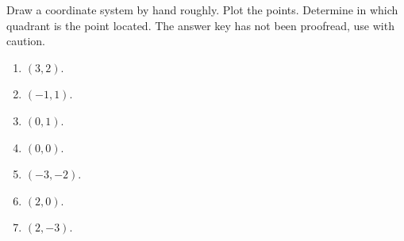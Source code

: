 Draw a coordinate system by hand roughly. Plot the points. Determine in which quadrant is the point located. The answer key has not been proofread, use with caution.
\begin{multicols}{3}
\begin{enumerate} [ref={\fcProblemRef}]
\item $ (3,2)$.

\item $ (-1,1)$.

\item $ (0,1)$.

\item $ (0,0)$.

\item $ (-3,-2)$.

\item $ (2,0)$.

\item $ (2,-3)$.

\end{enumerate}
\end{multicols}
